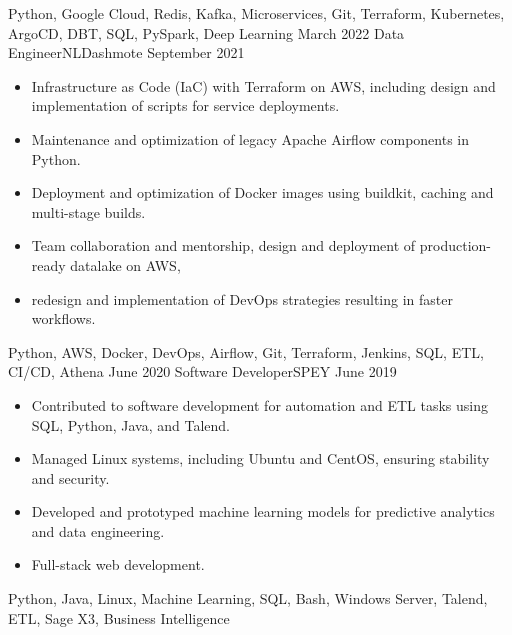\begin{experiences}
{  }
  {Python, Google Cloud, Redis, Kafka, Microservices, Git, Terraform, Kubernetes, ArgoCD, DBT, SQL, PySpark, Deep Learning}
  \emptySeparator
  \experience
  {March 2022}   {Data Engineer}{NL}{Dashmote}
  {September 2021} {
    \begin{itemize}
      \item Infrastructure as Code (IaC) with Terraform on AWS, including design and implementation of scripts for service deployments.
      \item Maintenance and optimization of legacy Apache Airflow components in Python.
      \item Deployment and optimization of Docker images using buildkit, caching and multi-stage builds.
      \item Team collaboration and mentorship, design and deployment of production-ready datalake on AWS,
      \item redesign and implementation of DevOps strategies resulting in faster workflows.

    \end{itemize}
  }
  {Python, AWS, Docker, DevOps, Airflow, Git, Terraform, Jenkins, SQL, ETL, CI/CD, Athena}
  \emptySeparator
  \experience
  {June 2020}   {Software Developer}{SP}{EY}
  {June 2019} {
    \begin{itemize}
      \item Contributed to software development for automation and ETL tasks using SQL, Python, Java, and Talend.
      \item Managed Linux systems, including Ubuntu and CentOS, ensuring stability and security.
      \item Developed and prototyped machine learning models for predictive analytics and data engineering.
      \item Full-stack web development.
    \end{itemize}
  }
  {Python, Java, Linux, Machine Learning, SQL, Bash, Windows Server, Talend, ETL, Sage X3, Business Intelligence}
  \emptySeparator
\end{experiences}
